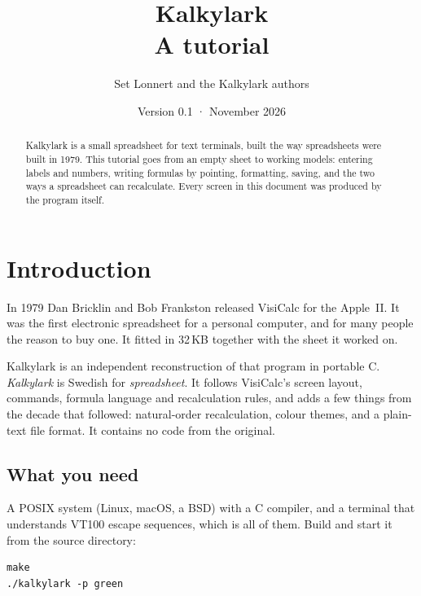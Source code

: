 \documentclass[11pt]{article}
\title{\sffamily\bfseries\color{ink}Kalkylark\\[4pt]
  \Large\mdseries A tutorial}
\author{\sffamily Set Lonnert and the Kalkylark authors}
\date{\sffamily Version 0.1 · November 2026}
\begin{document}
\maketitle
\thispagestyle{empty}

\begin{center}

\end{center}

\vspace{1em}
\begin{abstract}
\noindent Kalkylark is a small spreadsheet for text terminals, built the way
spreadsheets were built in 1979. This tutorial goes from an empty sheet to
working models: entering labels and numbers, writing formulas by pointing,
formatting, saving, and the two ways a spreadsheet can recalculate. Every
screen in this document was produced by the program itself.
\end{abstract}

\newpage
\tableofcontents
\newpage

\section{Introduction}

In 1979 Dan Bricklin and Bob Frankston released VisiCalc for the Apple~II.
It was the first electronic spreadsheet for a personal computer, and for
many people the reason to buy one. It fitted in 32\,KB together with the
sheet it worked on.

Kalkylark is an independent reconstruction of that program in portable C.
\emph{Kalkylark} is Swedish for \emph{spreadsheet}. It follows VisiCalc's
screen layout, commands, formula language and recalculation rules, and adds
a few things from the decade that followed: natural-order recalculation,
colour themes, and a plain-text file format. It contains no code from the
original.

\subsection{What you need}

A POSIX system (Linux, macOS, a BSD) with a C compiler, and a terminal that
understands VT100 escape sequences, which is all of them. Build and start it
from the source directory:

\begin{lstlisting}
make
./kalkylark -p green
\end{lstlisting}
\end{document}

